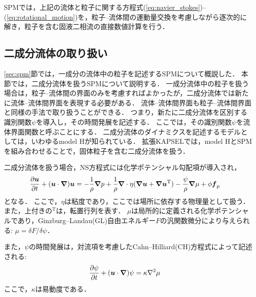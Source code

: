 \documentclass[pdflatex,a4paper,10pt,ja=standard]{bxjsarticle}
\def\vec#1{\mbox{\boldmath $#1$}}
\begin{document}
SPMでは，上記の流体と粒子に関する方程式(\ref{eq:navier_stokes})--(\ref{eq:rotational_motion})を，粒子--流体間の運動量交換を考慮しながら逐次的に解き，粒子を含む固液二相流の直接数値計算を行う．

\subsection{二成分流体の取り扱い}
\label{sec:phase_separation}
\ref{sec:spm}節では，一成分の流体中の粒子を記述するSPMについて概説した．
本節では，二成分流体を扱うSPMについて説明する．
一成分流体中の粒子を扱う場合は，粒子--流体間の界面のみを考慮すればよかったが，二成分流体では新たに流体--流体間界面を表現する必要がある．
流体--流体間界面も粒子--流体間界面と同様の手法で取り扱うことができる．
つまり，新たに二成分流体を区別する識別関数$\psi$を導入し，その時間発展を記述する．
ここでは，その識別関数$\psi$を流体界面関数と呼ぶことにする．
二成分流体のダイナミクスを記述するモデルとしては，いわゆるmodel Hが知られている\autocite{hohenberg1977theory}．
拡張KAPSELでは，model HとSPMを組み合わせることで，固体粒子を含む二成分流体を扱う．

二成分流体を扱う場合，NS方程式には化学ポテンシャル勾配項が導入され，
\begin{align}
    \frac{\partial \vec{u}}{\partial t} + (\vec{u}\cdot \vec{\nabla}) \vec{u} & = - \frac{1}{\rho} \vec{\nabla} p + \frac{1}{\rho} \vec{\nabla} \cdot \eta (\vec{\nabla}\vec{u} + \vec{\nabla}\vec{u}^{\mathrm T}) - \frac{\psi}{\rho} \vec{\nabla} \mu + \phi \vec{f}_{\mathrm p}
    \label{eq:navier_stokes_model_h}
\end{align}
となる．
ここで，$\eta$は粘度であり，ここでは場所に依存する物理量として扱う．
また，上付きの${}^\mathrm{T}$は，転置行列を表す．
$\mu$は局所的に定義される化学ポテンシャルであり，Ginzburg--Landau(GL)自由エネルギー$F$の汎関数微分により与えられる: $\mu = \delta F/\delta \psi$．

また，$\psi$の時間発展は，対流項を考慮したCahn--Hilliard(CH)方程式によって記述される:
\begin{align}
    \frac{\partial \psi}{\partial t} + (\vec{u}\cdot \vec{\nabla}) \psi & = \kappa \nabla ^2 \mu
    \label{eq:cahn_hilliard}
\end{align}
ここで，$\kappa$は易動度である．
\end{document}
